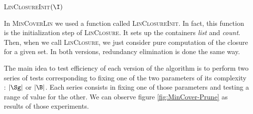 \begin{algorithm}[H]
	
	\BlankLine
	\BlankLine
	
	\textsc{LinClosureInit}$(\I)$ \;
	
	
	\BlankLine
	

	
	\label{alg:MinCoverLin}
\end{algorithm}


\vspace{1.2em}

In \textsc{MinCoverLin} we used a function called \textsc{LinClosureInit}. In fact, this function is the initialization step of \textsc{LinClosure}. It sets up the containers \textit{list} and \textit{count}. Then, when we call \textsc{LinClosure}, we just consider pure computation of the closure for a given set. In both versions, redundancy elimination is done the same way.

\vspace{1.2em}

The main idea to test efficiency of each version of the algorithm is to perform
two series of tests corresponding to fixing one of the two parameters of its complexity : $|\Sg|$ or $|\B|$. Each series consists in fixing one of those parameters and testing a range of value for the other. We can observe figure
\ref{fig:MinCover-Prune} as results of those experiments.


\begin{figure}[ht]
	
\end{figure}

\vspace{1.2em}

